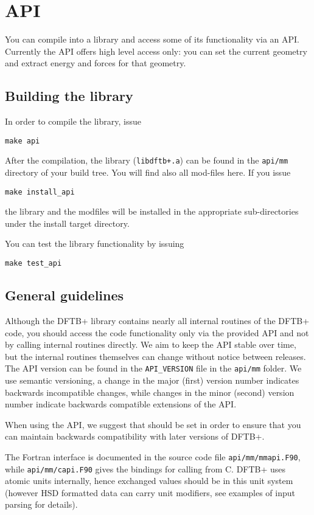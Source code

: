 \chapter{\dftbp{} API}

You can compile \dftbp{} into a library and access some of its functionality via
an API. Currently the API offers high level access only: you can set the current
geometry and extract energy and forces for that geometry.

\section{Building the library}

In order to compile the \dftbp{} library, issue
\begin{verbatim}
make api
\end{verbatim}
After the compilation, the library (\verb|libdftb+.a|) can be found in the
\verb|api/mm| directory of your build tree. You will find also all mod-files
here. If you issue
\begin{verbatim}
make install_api
\end{verbatim}
the library and the modfiles will be installed in the appropriate
sub-directories under the install target directory. 

You can test the library functionality by issuing
\begin{verbatim}
make test_api
\end{verbatim}


\section{General guidelines}

Although the DFTB+ library contains nearly all internal routines of the DFTB+
code, you should access the code functionality only via the provided API and not
by calling internal routines directly. We aim to keep the API stable over time,
but the internal routines themselves can change without notice between
releases. The API version can be found in the \verb|API_VERSION| file in the
\verb|api/mm| folder. We use semantic versioning, a change in the major (first)
version number indicates backwards incompatible changes, while changes in the
minor (second) version number indicate backwards compatible extensions of the
API.

When using the API, we suggest that  should be set in order to
ensure that you can maintain backwards compatibility with later versions of
DFTB+.

The Fortran interface is documented in the source code file
\verb|api/mm/mmapi.F90|, while \verb|api/mm/capi.F90| gives the bindings for
calling from C. DFTB+ uses atomic units internally, hence exchanged values
should be in this unit system (however HSD formatted data can carry unit
modifiers, see examples of input parsing for details).
